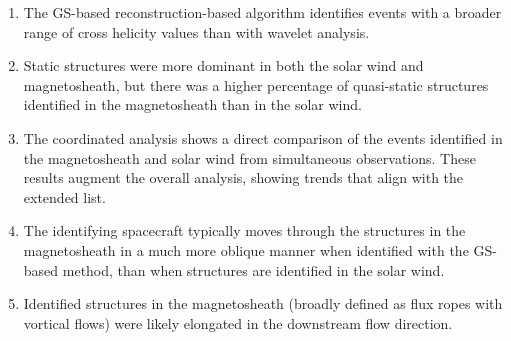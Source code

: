 \begin{enumerate}
    \item The GS-based reconstruction-based algorithm identifies events with a broader range of cross helicity values than with wavelet analysis.
    \item Static structures were more dominant in both the solar wind and magnetosheath, but there was a higher percentage of quasi-static structures identified in the magnetosheath than in the solar wind. %
    \item The coordinated analysis shows a direct comparison of the events identified in the magnetosheath and solar wind from simultaneous observations. These results augment the overall analysis, showing trends that align with the extended list.
    \item The identifying spacecraft typically moves through the structures in the magnetosheath in a much more oblique manner when identified with the GS-based method, than when structures are identified in the solar wind.
    \item Identified structures in the magnetosheath (broadly defined as flux ropes with vortical flows) were likely elongated in the downstream flow direction.
\end{enumerate}